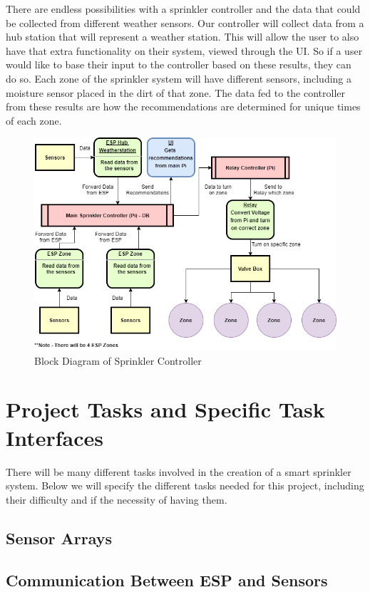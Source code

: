 \documentclass[letterpaper, 10 pt, conference]{ieeeconf}  %
\begin{document}
There are endless possibilities with a sprinkler controller and the data that could be collected from different weather sensors. Our controller will collect data from a hub station that will represent a weather station. This will allow the user to also have that extra functionality on their system, viewed through the UI. So if a user would like to base their input to the controller based on these results, they can do so. Each zone of the sprinkler system will have different sensors, including a moisture sensor placed in the dirt of that zone. The data fed to the controller from these results are how the recommendations are determined for unique times of each zone. 

\begin{figure}[H]
\includegraphics[scale=.4]{Diagram.png}
\caption{Block Diagram of Sprinkler Controller}
\end{figure}

\section{Project Tasks and Specific Task Interfaces}
There will be many different tasks involved in the creation of a smart sprinkler system. Below we will specify the different tasks needed for this project, including their difficulty and if the necessity of having them.

\subsection{Sensor Arrays}

\subsection{Communication Between ESP and Sensors}
\end{document}
